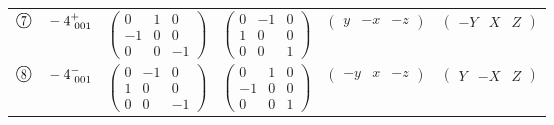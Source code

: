 \documentclass[fleqn,10pt,landscape]{jsarticle}
\begin{document}
\begin{center}
\begin{longtable}{lcccc}
$ {\ooalign{\hfil\resizebox{.8\width}{\height}{7}\hfil\crcr\raise.1ex\hbox{\large$\bigcirc$}}}\quad -4^{+}_{\,\,001} $ & $ \begin{pmatrix} 0 & 1 & 0 \\ -1 & 0 & 0 \\ 0 & 0 & -1 \end{pmatrix} $ & $ \begin{pmatrix} 0 & -1 & 0 \\ 1 & 0 & 0 \\ 0 & 0 & 1 \end{pmatrix} $ & $ \begin{pmatrix} y & - x & - z \end{pmatrix} $ & $ \begin{pmatrix} - Y & X & Z \end{pmatrix} $ \\
$ {\ooalign{\hfil\resizebox{.8\width}{\height}{8}\hfil\crcr\raise.1ex\hbox{\large$\bigcirc$}}}\quad -4^{-}_{\,\,001} $ & $ \begin{pmatrix} 0 & -1 & 0 \\ 1 & 0 & 0 \\ 0 & 0 & -1 \end{pmatrix} $ & $ \begin{pmatrix} 0 & 1 & 0 \\ -1 & 0 & 0 \\ 0 & 0 & 1 \end{pmatrix} $ & $ \begin{pmatrix} - y & x & - z \end{pmatrix} $ & $ \begin{pmatrix} Y & - X & Z \end{pmatrix} $ \\
\end{longtable}
\end{center}
\newpage
\end{document}
